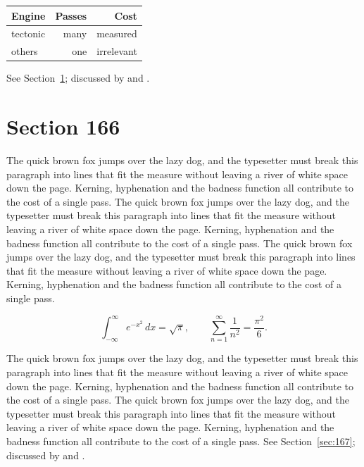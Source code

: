 \documentclass{article}
\begin{document}
\begin{center}
\begin{tabular}{lrr}
\toprule
Engine & Passes & Cost \\
\midrule
tectonic & many & measured \\
others & one & irrelevant \\
\bottomrule
\end{tabular}
\end{center}

See Section~\ref{sec:166}; discussed by \textcite{k1} and \textcite{l3}.
\section{Section 166}
\label{sec:166}
The quick brown fox jumps over the lazy dog, and the typesetter must break this paragraph into lines that fit the measure without leaving a river of white space down the page. Kerning, hyphenation and the badness function all contribute to the cost of a single pass. The quick brown fox jumps over the lazy dog, and the typesetter must break this paragraph into lines that fit the measure without leaving a river of white space down the page. Kerning, hyphenation and the badness function all contribute to the cost of a single pass. The quick brown fox jumps over the lazy dog, and the typesetter must break this paragraph into lines that fit the measure without leaving a river of white space down the page. Kerning, hyphenation and the badness function all contribute to the cost of a single pass. 

\begin{equation}\label{eq:166}
\int_{-\infty}^{\infty} e^{-x^{2}}\,dx = \sqrt{\pi}, \qquad
\sum_{n=1}^{\infty} \frac{1}{n^{2}} = \frac{\pi^{2}}{6}.
\end{equation}

The quick brown fox jumps over the lazy dog, and the typesetter must break this paragraph into lines that fit the measure without leaving a river of white space down the page. Kerning, hyphenation and the badness function all contribute to the cost of a single pass. The quick brown fox jumps over the lazy dog, and the typesetter must break this paragraph into lines that fit the measure without leaving a river of white space down the page. Kerning, hyphenation and the badness function all contribute to the cost of a single pass. 
See Section~\ref{sec:167}; discussed by \textcite{k2} and \textcite{l4}.
\end{document}
